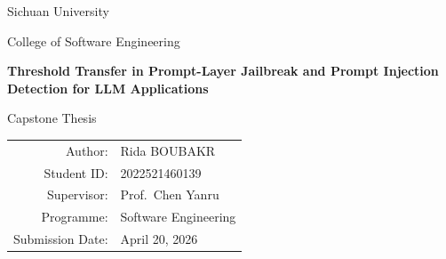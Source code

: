 \documentclass[12pt,oneside]{book}
\begin{document}
\begin{titlepage}
  \centering
  {\Large Sichuan University \par}
  \vspace{1cm}
  {\large College of Software Engineering \par}
  \vspace{2cm}
  {\Huge\bfseries Threshold Transfer in Prompt-Layer Jailbreak and Prompt Injection Detection for LLM Applications\par}
  \vspace{1.5cm}
  {\Large Capstone Thesis\par}
  \vfill
  \begin{tabular}{rl}
    Author: & Rida BOUBAKR \\
    Student ID: & 2022521460139 \\
    Supervisor: & Prof.\ Chen Yanru \\
    Programme: & Software Engineering \\
    Submission Date: & April 20, 2026 \\
  \end{tabular}
  \vfill
\end{titlepage}

\frontmatter

\tableofcontents
\listoffigures
\listoftables

\mainmatter









\appendix




\backmatter


\end{document}
